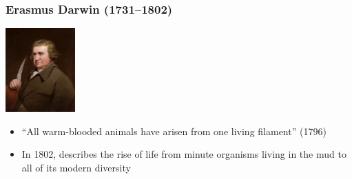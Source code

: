 \documentclass[10pt]{beamer}
\begin{document}
\begin{frame}[t]
\frametitle{Erasmus Darwin (1731--1802)}
	
	\begin{center}
		\includegraphics[width=0.20\textwidth]{figures/edarwin.jpg}\\
	\end{center}
	
	\vspace{0.25cm}
	
	\begin{itemize}
		\item ``All warm-blooded animals have arisen from one living filament'' (1796) 
		\medskip
		\item In 1802, describes the rise of life from minute organisms living in the mud to all of its modern diversity
	\end{itemize}
\end{frame}
\end{document}

